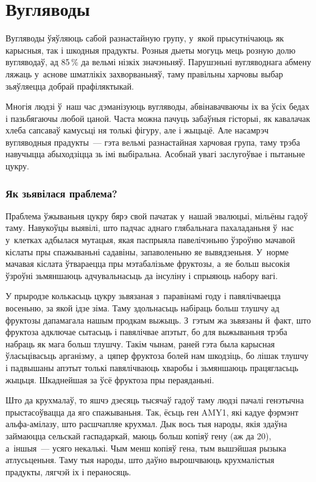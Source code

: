 \chapter{Вугляводы}

Вугляводы ўяўляюць сабой разнастайную групу, у~якой прысутнічаюць як карысныя, так і шкодныя прадукты. Розныя дыеты могуць мець розную долю вугляводаў, ад 85\,\% да вельмі нізкіх значэньняў. Парушэньні вугляводнага абмену ляжаць у~аснове шматлікіх захворваньняў, таму правільны харчовы выбар зьяўляецца добрай прафіляктыкай.

Многія людзі ў~наш час дэманізуюць вугляводы, абвінавачваючы іх ва ўсіх бедах і пазьбягаючы любой цаной. Часта можна пачуць забаўныя гісторыі, як кавалачак хлеба сапсаваў камусьці ня толькі фігуру, але і жыцьцё. Але насамрэч вугляводныя прадукты~--- гэта вельмі разнастайная харчовая група, таму трэба навучыцца абыходзіцца зь імі выбіральна. Асобнай увагі заслугоўвае і пытаньне цукру.

\subsection{Як зьявілася праблема?}

Праблема ўжываньня цукру бярэ свой пачатак у~нашай эвалюцыі, мільёны гадоў таму. Навукоўцы выявілі, што падчас аднаго глябальнага пахаладаньня ў~нас у~клетках адбылася мутацыя, якая паспрыяла павелічэньню ўзроўню мачавой кіслаты пры спажываньні садавіны, запаволеньню яе вывядзеньня. У~норме мачавая кіслата ўтвараецца пры мэтабалізьме фруктозы, а~яе больш высокія ўзроўні зьмяншаюць адчувальнасьць да інсуліну і спрыяюць набору вагі.

У прыродзе колькасьць цукру зьвязаная з~паравінамі году і павялічваецца восеньню, за якой ідзе зіма. Таму здольнасьць набіраць больш тлушчу ад фруктозы дапамагала нашым продкам выжыць. З~гэтым жа зьвязаны й~факт, што фруктоза адключае сытасьць і павялічвае апэтыт, бо для выжываньня трэба набраць як мага больш тлушчу. Такім чынам, раней гэта была карысная ўласьцівасьць арганізму, а~цяпер фруктоза болей нам шкодзіць, бо лішак тлушчу і падвышаны апэтыт толькі павялічваюць хваробы і зьмяншаюць працягласьць жыцьця. Шкаднейшая за ўсё фруктоза пры пераяданьні.


Што да крухмалаў, то яшчэ дзесяць тысячаў гадоў таму людзі пачалі генэтычна прыстасоўвацца да яго спажываньня. Так, ёсьць ген AMY1, які кадуе фэрмэнт альфа-амілазу, што расшчапляе крухмал. Дык вось тыя народы, якія здаўна займаюцца сельскай гаспадаркай, маюць больш копіяў гену (аж да 20), а~іншыя~--- усяго некалькі. Чым менш копіяў гена, тым вышэйшая рызыка атлусьценьня. Таму тыя народы, што даўно вырошчваюць крухмалістыя прадукты, лягчэй іх і пераносяць.

